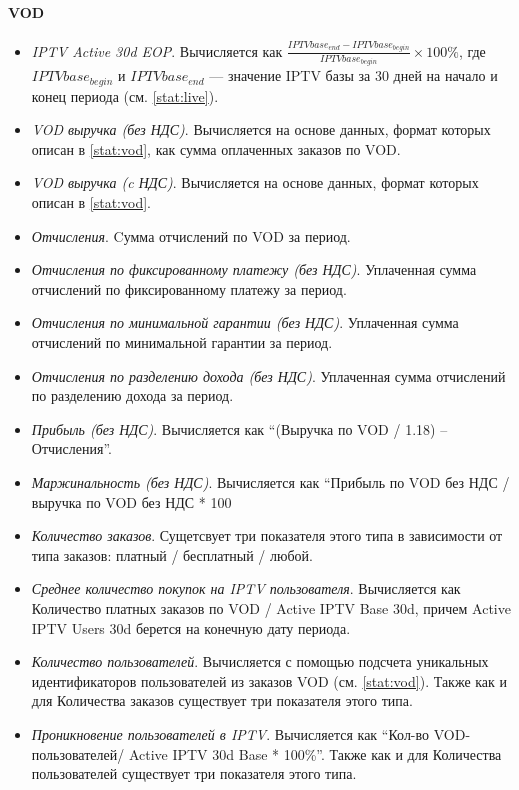 \paragraph{VOD}
\begin{itemize}
\item{
\textit{IPTV Active 30d EOP}. Вычисляется как $\frac{IPTVbase_{end} - IPTVbase_{begin}}{IPTVbase_{begin}} \times 100 \% $, 
где $IPTVbase_{begin}$ и $IPTVbase_{end}$ --- значение IPTV базы за 30 дней на начало и конец периода (см. \ref{stat:live}).
}
\item{
\textit{VOD выручка (без НДС)}. Вычисляется на основе данных, формат которых описан в \ref{stat:vod}, как сумма оплаченных
заказов по VOD.
}
\item{
\textit{VOD выручка (c НДС)}. Вычисляется на основе данных, формат которых описан в \ref{stat:vod}.
}
\item{
\textit{Отчисления}. Cумма отчислений по VOD за период.
}
\item{
\textit{Отчисления по фиксированному платежу (без НДС)}. Уплаченная сумма отчислений по фиксированному платежу за период.
}
\item{
\textit{Отчисления по минимальной гарантии (без НДС)}. Уплаченная сумма отчислений по минимальной гарантии за период.
}
\item{
\textit{Отчисления по разделению дохода (без НДС)}. Уплаченная сумма отчислений по разделению дохода за период.
}
\item{
\textit{Прибыль (без НДС)}. Вычисляется как ``(Выручка по VOD / 1.18) – Отчисления''.
}
\item{
\textit{Маржинальность (без НДС)}. Вычисляется как ``Прибыль по VOD без НДС / выручка по VOD без НДС * 100%
}
\item{
\textit{Количество заказов}. Сущетсвует три показателя этого типа в зависимости от типа заказов: платный / бесплатный / любой.
}
\item{
\textit{Среднее количество покупок на IPTV пользователя}. Вычисляется как
Количество платных заказов по VOD / Active IPTV Base 30d, причем Active IPTV Users 30d берется на конечную дату периода.
}
\item{
\textit{Количество пользователей}. Вычисляется с помощью подсчета уникальных идентификаторов пользователей из заказов VOD
(см. \ref{stat:vod}). Также как и для Количества заказов существует три показателя этого типа.
}
\item{
\textit{Проникновение пользователей в IPTV}. Вычисляется как 
``Кол-во VOD-пользователей/ Active IPTV 30d Base * 100\%''. Также как и для Количества пользователей существует три показателя этого типа. 
}
\end{itemize}
